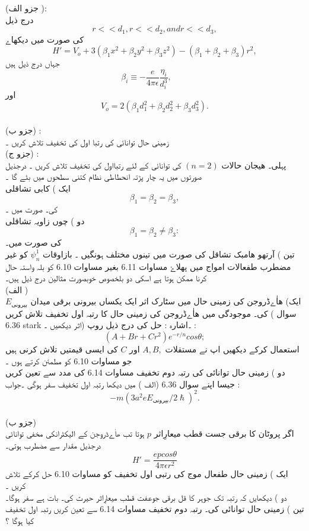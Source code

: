(جزو الف ):\\
 درج ذیل 
\[r<<d_{1},r<<d_{2},andr<<d_{3},\]
کی صورت میں دیکھاے
\[H'=V_{o}+3(\beta_{1}x^{2}+\beta_{2}y^{2}+\beta_{3}z^{2})-(\beta_{1}+\beta_{2}+\beta_{3})r^{2},\]
جہاں  درج ذیل ہیں
\[\beta_{i}\equiv-\frac{e}{4\pi\epsilon}\frac{\eta_{i}}{d_{i}^{3}},\quad\quad\]
اور 
\[V_{o}=2(\beta_{1}d_{1}^{2}+\beta_{2}d_{2}^{2}+\beta_{3}d_{3}^{2}).\]\\
(جزو ب) : \\زمینی حال توانائی کی رتبا اول کی تخفیف تلاش کریں ۔\\
(جزو ج) :\\ پہلی۔ هیجان حالات 
\((n=2)\)
کی توانائی کے لئے رتبااول کی تخفیف تلاش کریں ۔ درجذیل صورتوں میں یہ چار پڑتہ انحطاطی نظام کتنی سطحوں میں بٹے گا ۔\\
ایک ) کابی تشاقلی
\[\beta_{1}=\beta_{2}=\beta_{3},\]
کی۔ صورت میں ۔\\
دو ) چوں زاویہ تشاقلی
\[\beta_{1}=\beta_{2}\neq\beta_{3}:\]
کی صورت میں۔\\
تین ) آرتھو ھامبک تشاقل کی صورت میں تینوں مختلف ہونگیں ۔
بازاوقات 
\(\psi_{n}^{1}\)
کو غیر مضطرب طفعالات امواج میں پهلاۓ  مساوات 6.11 بغیر مساوات 6.10 کو بلہ واستہ حال کرنا ممکن ہوتا ہے اسکی دو بلخصوص خوبصورت مثالین درج ذیل ہیں۔\\
(الف )\\
ایک) ھاٰےڈروجن کی زمینی حال میں سٹارک اثر ایک یکساں بیرونی برقی میدان 
\(E_{\text{بیرونی}}\)
کی۔ موجودگی میں ھاٰےڈروجن  کی زمینی حال کا رتبہ اول تخفیف تلاش کریں ( سوال 6.36 stark اثر دیکھیں ۔) ۔اشارہ : حل کی درج ذیل روپ :\\
\[(A+Br+Cr^{2})e^{-r/n}cos\theta;\]
استعمال کرکے دیکھیں اپ نے مستقلات 
\(A,B,\)
اور 
\(C\)
کی ایسی قیمتیں تلاش کرنی ہیں جو مساوات 6.10 کو مطمئن کرتے ہوں ۔\\
دو ) زمینی حال توانائی کی رتبہ دوم تخفیف مساوات 6.14 کی مدد سے  تعین کریں جیسا اپنے سوال 6.36 (الف ) میں دیکھا رتبہ اول تخفیف سفر ہوگی ۔جواب :\\
\[-m(3a^{2}eE_{\text{بیرونی}}/2\hslash)^{2}.\]\\
(جزو ب)\\ اگر پروٹان کا برقی جست قطب میعارِاثر 
\(p\)
ہوتا تب  ھاٰےڈروجن کے  الیکٹرانکی مخفی توانائی درجذیل مقدار سے مضطرب ہوتی۔
\[H'=\frac{epcos\theta}{4\pi\epsilon r^{2}}\]
ایک ) زمینی حال طفعال موج کی رتبی اول تخفیف کو مساوات 6.10 حل کرکے تلاش کریں ۔\\
دو ) دیکھایں کہ رتبہ تک جوہر کا قل برقی جوعفت قطب میعارِاثر حیرت کی۔ بات ہے سفر ہوگا۔ \\
تین ) زمینی حال توانائی کی۔ رتبہ دوم تخفیف مساوات 6.14 سے تعین کریں رتبہ اول تخفیف کیا ہوگا ؟

